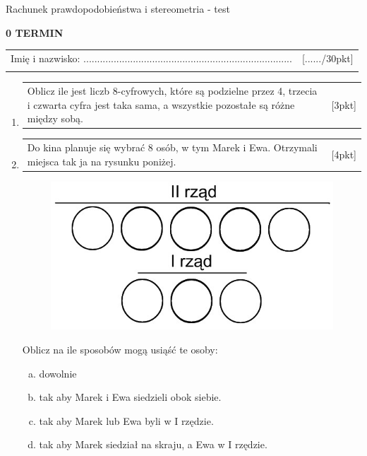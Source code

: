 \documentclass[12pt,a4paper]{article}
\begin{document}
	\begin{center}
		\LARGE Rachunek prawdopodobieństwa i stereometria - test
	\end{center}
	\vspace{1.5cm}
	\begin{flushright}
		\textbf{0 TERMIN}
	\end{flushright}
	\begin{tabular}{p{13cm} r}
		Imię i nazwisko: ............................................................................
		&[....../30pkt]\\ 
		\vspace{0.5cm}
	\end{tabular}
	\begin{enumerate}[1.]
		\item  \begin{tabular}{p{13cm} r}
			Oblicz ile jest liczb  8-cyfrowych, które są podzielne przez 4, trzecia i czwarta cyfra jest taka sama, a wszystkie pozostałe są różne między sobą.&[3pkt]\\ 
		\end{tabular}
	
		\item  \begin{tabular}{p{13cm} r}
			Do kina planuje się wybrać 8 osób, w tym Marek i Ewa. Otrzymali miejsca tak ja na rysunku poniżej.&[4pkt]\\ 
		\end{tabular}
	
		\begin{figure}[h]
			\centering
			\includegraphics[scale=0.4]{rpst1.jpeg}
		\end{figure}
	
		Oblicz na ile sposobów mogą usiąść te osoby:
		\begin{enumerate}[a)]
			\item dowolnie
			\item tak aby Marek i Ewa siedzieli obok siebie.
			\item tak aby Marek lub Ewa byli w I rzędzie.
			\item tak aby Marek siedział na skraju, a Ewa w I rzędzie.
		\end{enumerate}
	

\end{enumerate}
\end{document}
